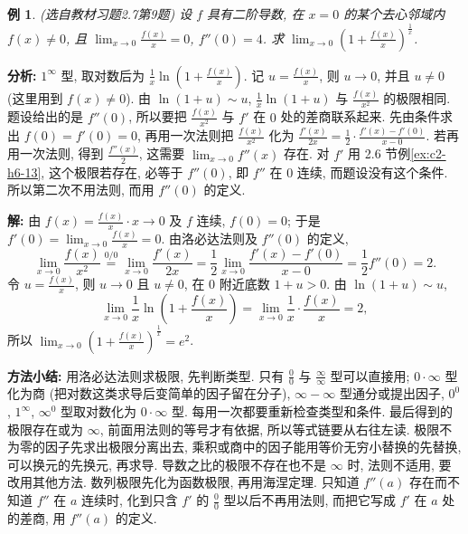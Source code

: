 \documentclass[UTF8,openany]{ctexbook}
\theoremstyle{chinesetextbook}
\newtheorem{example}{例}[section]
\newenvironment{cnsolution}{\par\indent\textbf{解:} \ignorespaces}{\par}
\begin{document}
\begin{example}\label{ex:c2-h7-9}
\textnormal{(选自教材习题2.7第9题)} 设 $f$ 具有二阶导数, 在 $x=0$ 的某个去心邻域内 $f(x)\ne0$, 且 $\displaystyle\lim_{x\to0}\frac{f(x)}x=0$, $f''(0)=4$. 求 $\displaystyle\lim_{x\to0}\left(1+\frac{f(x)}x\right)^{\frac1x}$.
\end{example}
\par\indent\textbf{分析:} $1^\infty$ 型, 取对数后为 $\displaystyle\frac1x\ln\left(1+\frac{f(x)}x\right)$. 记 $\displaystyle u=\frac{f(x)}x$, 则 $u\to0$, 并且 $u\ne0$ (这里用到 $f(x)\ne0$). 由 $\ln(1+u)\sim u$, $\displaystyle\frac1x\ln(1+u)$ 与 $\displaystyle\frac{f(x)}{x^2}$ 的极限相同. 题设给出的是 $f''(0)$, 所以要把 $\displaystyle\frac{f(x)}{x^2}$ 与 $f'$ 在 $0$ 处的差商联系起来. 先由条件求出 $f(0)=f'(0)=0$, 再用一次法则把 $\displaystyle\frac{f(x)}{x^2}$ 化为 $\displaystyle\frac{f'(x)}{2x}=\frac12\cdot\frac{f'(x)-f'(0)}{x-0}$. 若再用一次法则, 得到 $\displaystyle\frac{f''(x)}2$, 这需要 $\displaystyle\lim_{x\to0}f''(x)$ 存在. 对 $f'$ 用 2.6 节例\ref{ex:c2-h6-13}, 这个极限若存在, 必等于 $f''(0)$, 即 $f''$ 在 $0$ 连续, 而题设没有这个条件. 所以第二次不用法则, 而用 $f''(0)$ 的定义.
\begin{cnsolution}
由 $\displaystyle f(x)=\frac{f(x)}x\cdot x\to0$ 及 $f$ 连续, $f(0)=0$; 于是 $\displaystyle f'(0)=\lim_{x\to0}\frac{f(x)}x=0$. 由洛必达法则及 $f''(0)$ 的定义,
\[
\lim_{x\to0}\frac{f(x)}{x^2}\overset{0/0}{=}\lim_{x\to0}\frac{f'(x)}{2x}=\frac12\lim_{x\to0}\frac{f'(x)-f'(0)}{x-0}=\frac12f''(0)=2.
\]
令 $\displaystyle u=\frac{f(x)}x$, 则 $u\to0$ 且 $u\ne0$, 在 $0$ 附近底数 $1+u>0$. 由 $\ln(1+u)\sim u$,
\[
\lim_{x\to0}\frac1x\ln\left(1+\frac{f(x)}x\right)=\lim_{x\to0}\frac1x\cdot\frac{f(x)}x=2,
\]
所以 $\displaystyle\lim_{x\to0}\left(1+\frac{f(x)}x\right)^{\frac1x}=e^2$.
\end{cnsolution}
\par\indent\textbf{方法小结:} 用洛必达法则求极限, 先判断类型. 只有 $\displaystyle\frac00$ 与 $\displaystyle\frac\infty\infty$ 型可以直接用; $0\cdot\infty$ 型化为商 (把对数这类求导后变简单的因子留在分子), $\infty-\infty$ 型通分或提出因子, $0^0$, $1^\infty$, $\infty^0$ 型取对数化为 $0\cdot\infty$ 型. 每用一次都要重新检查类型和条件. 最后得到的极限存在或为 $\infty$, 前面用法则的等号才有依据, 所以等式链要从右往左读. 极限不为零的因子先求出极限分离出去, 乘积或商中的因子能用等价无穷小替换的先替换, 可以换元的先换元, 再求导. 导数之比的极限不存在也不是 $\infty$ 时, 法则不适用, 要改用其他方法. 数列极限先化为函数极限, 再用海涅定理. 只知道 $f''(a)$ 存在而不知道 $f''$ 在 $a$ 连续时, 化到只含 $f'$ 的 $\displaystyle\frac00$ 型以后不再用法则, 而把它写成 $f'$ 在 $a$ 处的差商, 用 $f''(a)$ 的定义.
\end{document}
